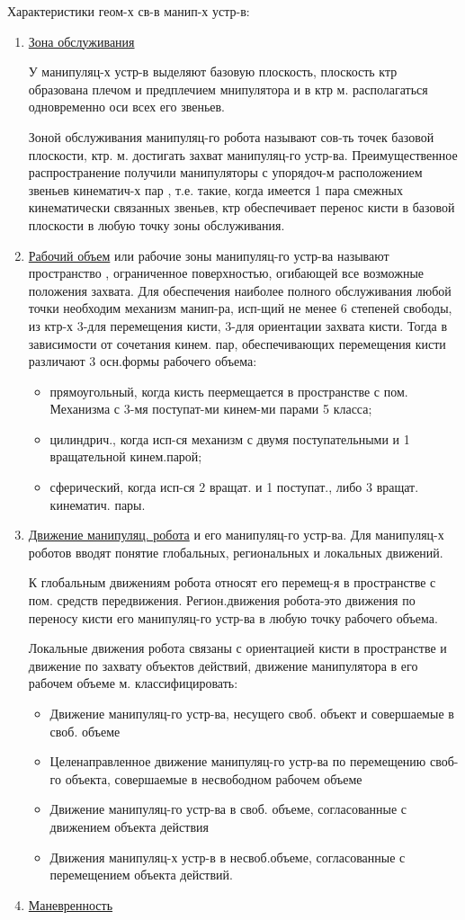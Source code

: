 \documentclass[unicode, 12pt, a4paper, oneside]{article}
\begin{document}
Характеристики геом-х св-в манип-х устр-в:
\begin{enumerate}
\item  \underline{Зона обслуживания}

У манипуляц-х устр-в выделяют базовую плоскость, плоскость ктр образована плечом и предплечием мнипулятора и в ктр м. располагаться одновременно оси всех его звеньев.

Зоной обслуживания манипуляц-го робота называют сов-ть точек базовой плоскости, ктр. м. достигать захват манипуляц-го устр-ва. Преимущественное распространение получили манипуляторы с упорядоч-м расположением звеньев кинематич-х пар , т.е. такие, когда имеется 1 пара смежных кинематически связанных звеньев, ктр обеспечивает перенос кисти в базовой плоскости в любую точку зоны обслуживания.

\item \underline{Рабочий объем} или рабочие зоны манипуляц-го устр-ва называют пространство , ограниченное поверхностью, огибающей все возможные положения захвата. Для обеспечения наиболее полного обслуживания любой точки необходим механизм манип-ра, исп-щий не менее 6 степеней свободы, из ктр-х 3-для перемещения кисти, 3-для ориентации захвата кисти. Тогда в зависимости от сочетания кинем. пар, обеспечивающих перемещения кисти различают 3 осн.формы рабочего объема:
\begin{itemize}
\item	прямоугольный, когда кисть пеермещается в пространстве с пом. Механизма с 3-мя поступат-ми кинем-ми парами 5 класса;
\item цилиндрич., когда исп-ся механизм с двумя поступательными и 1 вращательной кинем.парой;
\item сферический, когда исп-ся 2 вращат. и 1 поступат., либо 3 вращат. кинематич. пары.
\end{itemize}
\item  \underline{Движение манипуляц. робота} и его манипуляц-го устр-ва. Для манипуляц-х роботов вводят понятие глобальных, региональных и локальных движений.

К глобальным движениям робота относят его перемещ-я в пространстве с пом. средств передвижения.
Регион.движения робота-это движения по переносу кисти его манипуляц-го устр-ва в любую точку рабочего объема.

Локальные движения робота связаны с ориентацией кисти в пространстве и движение по захвату объектов действий, движение манипулятора в его рабочем объеме м. классифицировать:
\begin{itemize}
\item	Движение манипуляц-го устр-ва, несущего своб. объект и совершаемые в своб. объеме
\item	Целенаправленное движение манипуляц-го устр-ва по перемещению своб-го объекта, совершаемые в несвободном рабочем объеме
\item	Движение манипуляц-го устр-ва в своб. объеме, согласованные с движением объекта действия
\item	Движения манипуляц-х устр-в в несвоб.объеме, согласованные с перемещением объекта действий.
\end{itemize}
\item \underline{Маневренность}


\end{enumerate}
\end{document}
